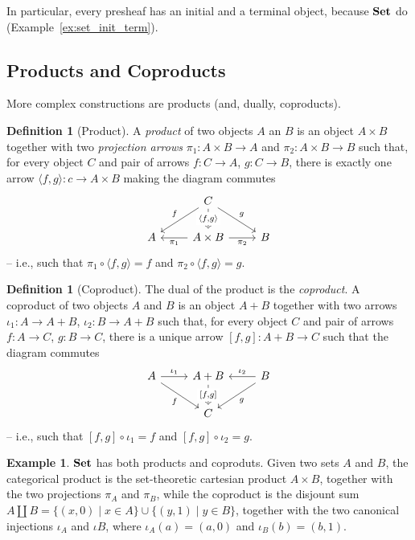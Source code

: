 \documentclass[a4paper, twoside,openright]{report}
\theoremstyle{plain}
\theoremstyle{definition}
\newtheorem{definition}[theorem]{Definition}
\newtheorem{example}[theorem]{Example}
\begin{document}
In particular, every presheaf has an initial and a terminal object, because $\mathbf{Set}$ do (Example~\ref{ex:set_init_term}).

\subsection{Products and Coproducts}

More complex constructions are products (and, dually, coproducts).

\begin{definition}[Product]
    A \emph{product} of two objects $A$ an $B$ is an object $A \times B$ together with two \emph{projection arrows} $\pi_1:A\times B \rightarrow A$ and $\pi_2: A \times B \rightarrow B$ such that, for every object $C$ and pair of arrows $f: C \rightarrow A$, $g: C \rightarrow B$, there is exactly one arrow $\langle f, g \rangle : c \rightarrow A \times B$ making the diagram commutes
    \[
        \begin{tikzcd}
                    & C \arrow[dl, "f" swap] \arrow[d, dashed, "{\langle f, g \rangle}" description] \arrow[dr, "g"] & \\
                A   & A \times B  \arrow[l, "{\pi_1}"] \arrow[r, "{\pi_2}" swap]    &  B    
        \end{tikzcd}
    \]
   -- i.e., such that $\pi_1 \circ \langle f, g \rangle = f$ and $\pi_2 \circ \langle f, g \rangle  = g$.
    
\end{definition}


\begin{definition}[Coproduct]
    The dual of the product is the \emph{coproduct}.
    A coproduct of two objects $A$ and $B$ is an object $A + B$ together with two arrows $\iota_1:A\rightarrow A+B$, $\iota_2: B \rightarrow A + B$ such that, for every object $C$ and pair of arrows $f:A \rightarrow C$, $g:B \rightarrow C$, there is a unique arrow $[f, g] : A + B \rightarrow C$ such that the diagram commutes
    \[
        \begin{tikzcd}
            A \arrow[r, "{\iota_1}"] \arrow[dr, "f" swap] & A+B \arrow[d, dashed, "{[f,g]}" description] & B \arrow[l, "{\iota_2}" swap] \arrow[dl, "g"] \\
            & C & 
        \end{tikzcd}
    \]
    -- i.e., such that $[f, g] \circ \iota_1 = f$ and $[f, g] \circ \iota_2 = g$.
\end{definition}

\begin{example}
    $\mathbf{Set}$ has both products and coproduts. Given two sets $A$ and $B$, the categorical product is the set-theoretic cartesian product $A \times B$, together with the two projections $\pi_A$ and $\pi_B$, while the coproduct is the disjount sum $A \coprod B = \{ (x, 0) \mid x \in A\} \cup \{(y, 1) \mid y \in B \}$, together with the two canonical injections $\iota_A$ and $\iota B$, where $\iota_A(a) = (a, 0)$ and $\iota_B(b) = (b, 1)$. 
\end{example}
\end{document}
